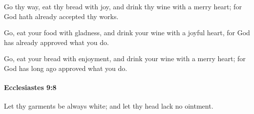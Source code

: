 			\begin{versebox}
					\item[BHS] 
					\item[LXX] 
					\item[ASV] Go thy way, eat thy bread with joy, and drink thy wine with a merry heart; for God hath already accepted thy works.
					\item[NIV] Go, eat your food with gladness, and drink your wine with a joyful heart, for God has already approved what you do.
					\item[NRSV] Go, eat your bread with enjoyment, and drink your wine with a merry heart; for God has long ago approved what you do.
			\end{versebox}

		\paragraph{Ecclesiastes 9:8} %
			\label{ECCLESIASTES-9-8}

			Let thy garments be always white; and let thy head lack no ointment.

